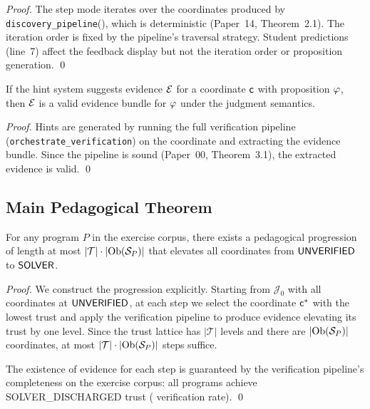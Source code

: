 \documentclass[11pt]{article}
\begin{document}
\begin{proof}
The step mode iterates over the coordinates produced by
\texttt{discovery\_pipeline}(\Site), which is deterministic (Paper~14,
Theorem~2.1). The iteration order is fixed by the pipeline's traversal
strategy. Student predictions (line~7) affect the feedback display but not
the iteration order or proposition generation. \qed
\end{proof}

\begin{lemma}\label{lem:hint-sound}
If the hint system suggests evidence $\mathcal{E}$ for a coordinate $\mathsf{c}$
with proposition $\varphi$, then $\mathcal{E}$ is a valid evidence bundle for
$\varphi$ under the judgment semantics.
\end{lemma}

\begin{proof}
Hints are generated by running the full verification pipeline
(\texttt{orchestrate\_verification}) on the coordinate and extracting the
evidence bundle. Since the pipeline is sound (Paper~00, Theorem~3.1), the
extracted evidence is valid. \qed
\end{proof}

\subsection{Main Pedagogical Theorem}

\begin{theorem}\label{thm:edu-complete}
For any program $P$ in the exercise corpus, there exists a pedagogical
progression of length at most $|\mathcal{T}| \cdot |\mathrm{Ob}(\mathcal{S}_P)|$ that
elevates all coordinates from $\mathsf{UNVERIFIED}$ to $\mathsf{SOLVER}$.
\end{theorem}

\begin{proof}
We construct the progression explicitly. Starting from
$\mathcal{J}_0$ with all coordinates at $\mathsf{UNVERIFIED}$, at each step we select
the coordinate $\mathsf{c}^*$ with the lowest trust and apply the verification
pipeline to produce evidence elevating its trust by one level. Since the
trust lattice has $|\mathcal{T}|$ levels and there are $|\mathrm{Ob}(\mathcal{S}_P)|$
coordinates, at most $|\mathcal{T}| \cdot |\mathrm{Ob}(\mathcal{S}_P)|$ steps suffice.

The existence of evidence for each step is guaranteed by the verification
pipeline's completeness on the exercise corpus: all
\ppLXVIprogramCount{} programs achieve SOLVER\_DISCHARGED trust
(\ppLXVIverifiedPct{} verification rate). \qed
\end{proof}
\end{document}
